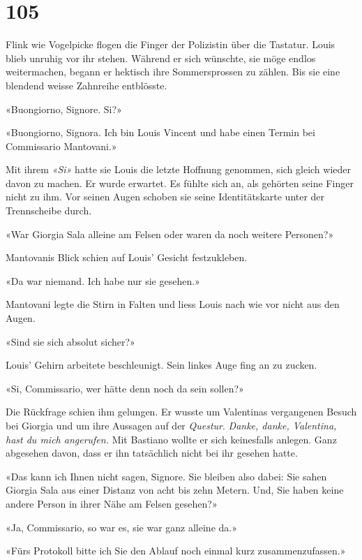 \chapter{105}



Flink wie Vogelpicke flogen die Finger der Polizistin über die Tastatur.
Louis blieb unruhig vor ihr stehen. Während er sich wünschte, sie möge
endlos weitermachen, begann er hektisch ihre Sommersprossen zu zählen.
Bis sie eine blendend weisse Zahnreihe entblösste.

«Buongiorno, Signore. Si?»

«Buongiorno, Signora. Ich bin Louis Vincent und habe einen Termin bei
Commissario Mantovani.»

Mit ihrem \emph{«Si»} hatte sie Louis die letzte Hoffnung genommen, sich gleich wieder davon zu machen. Er wurde erwartet. Es fühlte sich
an, als gehörten seine Finger nicht zu ihm. Vor seinen Augen schoben sie seine Identitätskarte unter der Trennscheibe durch.

\sectionbreak

«War Giorgia Sala alleine am Felsen oder waren da noch weitere
Personen?»

Mantovanis Blick schien auf Louis’ Gesicht festzukleben.

«Da war niemand. Ich habe nur sie gesehen.»

Mantovani legte die Stirn in Falten und liess Louis nach wie vor nicht
aus den Augen.

«Sind sie sich absolut sicher?»

Louis’ Gehirn arbeitete beschleunigt. Sein linkes Auge fing an zu
zucken.

«Si, Commissario, wer hätte denn noch da sein sollen?»

Die Rückfrage schien ihm gelungen. Er wusste um Valentinas vergangenen
Besuch bei Giorgia und um ihre Aussagen auf der \emph{Questur}. \emph{Danke,
danke, Valentina, hast du mich angerufen.} Mit Bastiano wollte er sich keinesfalls anlegen. Ganz abgesehen
davon, dass er ihn tatsächlich nicht bei ihr gesehen hatte.

«Das kann ich Ihnen nicht sagen, Signore. Sie bleiben also dabei: Sie
sahen Giorgia Sala aus einer Distanz von acht bis zehn Metern. Und, Sie
haben keine andere Person in ihrer Nähe am Felsen gesehen?»

«Ja, Commissario, so war es, sie war ganz alleine da.»

«Fürs Protokoll bitte ich Sie den Ablauf noch einmal kurz
zusammenzufassen.»

